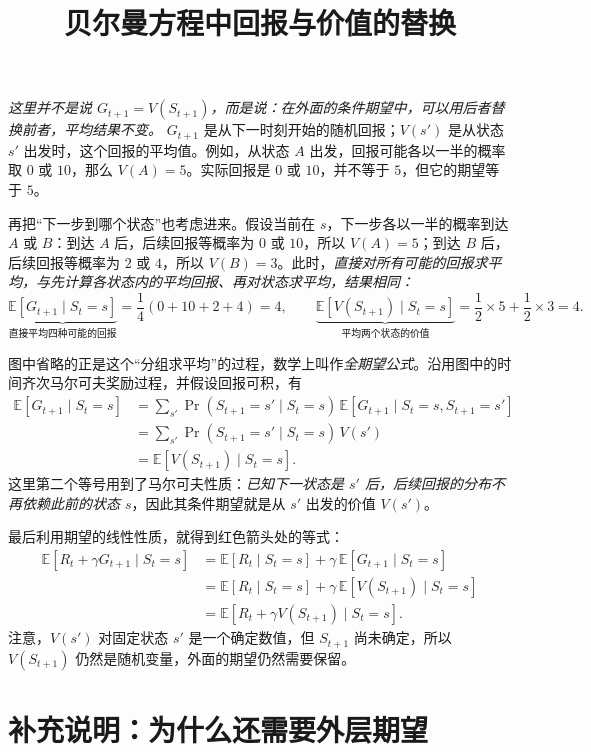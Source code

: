 \documentclass[UTF8,12pt,a4paper,fontset=fandol]{ctexart}
\title{贝尔曼方程中回报与价值的替换}
\author{}
\date{}
\begin{document}
\maketitle

\emph{这里并不是说 \(G_{t+1}=V(S_{t+1})\)，而是说：在外面的条件期望中，可以用后者替换前者，平均结果不变。} \(G_{t+1}\) 是从下一时刻开始的随机回报；\(V(s')\) 是从状态 \(s'\) 出发时，这个回报的平均值。例如，从状态 \(A\) 出发，回报可能各以一半的概率取 \(0\) 或 \(10\)，那么 \(V(A)=5\)。实际回报是 \(0\) 或 \(10\)，并不等于 \(5\)，但它的期望等于 \(5\)。

再把“下一步到哪个状态”也考虑进来。假设当前在 \(s\)，下一步各以一半的概率到达 \(A\) 或 \(B\)：到达 \(A\) 后，后续回报等概率为 \(0\) 或 \(10\)，所以 \(V(A)=5\)；到达 \(B\) 后，后续回报等概率为 \(2\) 或 \(4\)，所以 \(V(B)=3\)。此时，\emph{直接对所有可能的回报求平均，与先计算各状态内的平均回报、再对状态求平均，结果相同：}
\[
\underbrace{\mathbb E[G_{t+1}\mid S_t=s]}_{\text{直接平均四种可能的回报}}
=\frac14(0+10+2+4)=4,
\qquad
\underbrace{\mathbb E[V(S_{t+1})\mid S_t=s]}_{\text{平均两个状态的价值}}
=\frac12\times5+\frac12\times3=4.
\]

图中省略的正是这个“分组求平均”的过程，数学上叫作\emph{全期望公式}。沿用图中的时间齐次马尔可夫奖励过程，并假设回报可积，有
\[
\begin{aligned}
\mathbb E[G_{t+1}\mid S_t=s]
&=\sum_{s'}\Pr(S_{t+1}=s'\mid S_t=s)\,
  \mathbb E[G_{t+1}\mid S_t=s,S_{t+1}=s']\\
&=\sum_{s'}\Pr(S_{t+1}=s'\mid S_t=s)\,V(s')\\
&=\mathbb E[V(S_{t+1})\mid S_t=s].
\end{aligned}
\]
这里第二个等号用到了马尔可夫性质：\emph{已知下一状态是 \(s'\) 后，后续回报的分布不再依赖此前的状态 \(s\)}，因此其条件期望就是从 \(s'\) 出发的价值 \(V(s')\)。

最后利用期望的线性性质，就得到红色箭头处的等式：
\[
\begin{aligned}
\mathbb E[R_t+\gamma G_{t+1}\mid S_t=s]
&=\mathbb E[R_t\mid S_t=s]
  +\gamma\,\mathbb E[G_{t+1}\mid S_t=s]\\
&=\mathbb E[R_t\mid S_t=s]
  +\gamma\,\mathbb E[V(S_{t+1})\mid S_t=s]\\
&=\mathbb E[R_t+\gamma V(S_{t+1})\mid S_t=s].
\end{aligned}
\]
注意，\(V(s')\) 对固定状态 \(s'\) 是一个确定数值，但 \(S_{t+1}\) 尚未确定，所以 \(V(S_{t+1})\) 仍然是随机变量，外面的期望仍然需要保留。

\section*{补充说明：为什么还需要外层期望}
\end{document}
